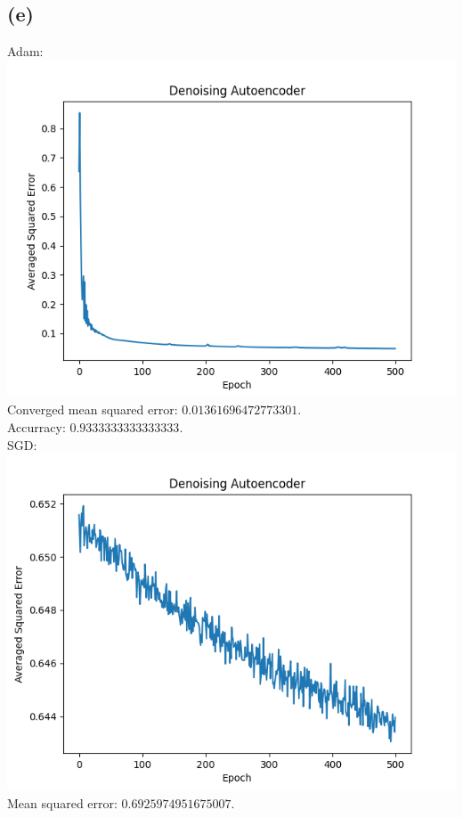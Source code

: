 \subsection{(e)}

Adam:\\
\includegraphics[width=15cm]{Denoising_Autoencoder_Error.png}\\
Converged mean squared error: $0.01361696472773301$.\\
Accurracy: $0.9333333333333333$.\\\newpage
SGD:\\
\includegraphics[width=15cm]{sgd.png}\\
Mean squared error: $0.6925974951675007$.\\
